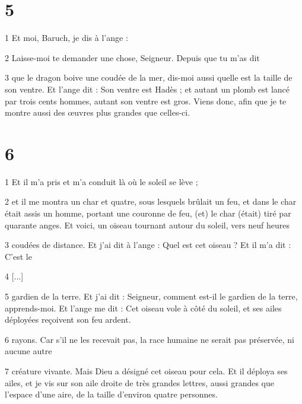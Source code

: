 \chapter{5}

\par 1 Et moi, Baruch, je dis à l'ange :

\par 2 Laisse-moi te demander une chose, Seigneur. Depuis que tu m'as dit

\par 3 que le dragon boive une coudée de la mer, dis-moi aussi quelle est la taille de son ventre. Et l'ange dit : Son ventre est Hadès ; et autant un plomb est lancé par trois cents hommes, autant son ventre est gros. Viens donc, afin que je te montre aussi des œuvres plus grandes que celles-ci.

\chapter{6}

\par 1 Et il m'a pris et m'a conduit là où le soleil se lève ;

\par 2 et il me montra un char et quatre, sous lesquels brûlait un feu, et dans le char était assis un homme, portant une couronne de feu, (et) le char (était) tiré par quarante anges. Et voici, un oiseau tournant autour du soleil, vers neuf heures

\par 3 coudées de distance. Et j'ai dit à l'ange : Quel est cet oiseau ? Et il m'a dit : C'est le

\par 4 [...]

\par 5 gardien de la terre. Et j'ai dit : Seigneur, comment est-il le gardien de la terre, apprends-moi. Et l'ange me dit : Cet oiseau vole à côté du soleil, et ses ailes déployées reçoivent son feu ardent.

\par 6 rayons. Car s'il ne les recevait pas, la race humaine ne serait pas préservée, ni aucune autre

\par 7 créature vivante. Mais Dieu a désigné cet oiseau pour cela. Et il déploya ses ailes, et je vis sur son aile droite de très grandes lettres, aussi grandes que l'espace d'une aire, de la taille d'environ quatre personnes.

